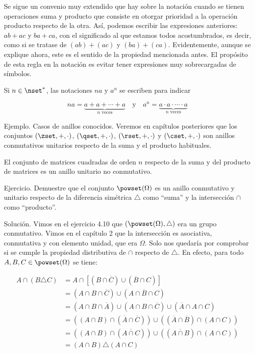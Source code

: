 Se sigue un convenio muy extendido que hay sobre la notación cuando se
tienen operaciones suma y producto que consiste en otorgar prioridad a la
operación producto respecto de la otra. Así, podemos escribir las
expresiones anteriores: $ab + ac$ y $ba + ca$, con el significado al que
estamos todos acostumbrados, es decir, como si se tratase de $(ab) + (ac)$ y
$(ba) + (ca)$. Evidentemente, aunque se explique ahora, este es el sentido
de la propiedad mencionada antes. El propósito de esta regla en la notación
es evitar tener expresiones muy sobrecargadas de símbolos.

Si $n \in \nset^*$, las notaciones $na$ y $a^n$ se escriben para indicar

$$ na = \underbrace{a + a + \cdots + a}_{\text{$n$ veces}} \quad \text{y}
\quad a^n = \underbrace{a \cdot a \cdot \cdots \cdot a}_{\text{$n$ veces}}
$$

Ejemplo. Casos de anillos conocidos. Veremos en capítulos posteriores que
los conjuntos $(\zset, +, \cdot)$, $(\qset, +, \cdot)$, $(\rset, +, \cdot)$
y $(\cset, +, \cdot)$ son anillos conmutativos unitarios respecto de la suma
y el producto habituales.

El conjunto de matrices cuadradas de orden $n$ respecto de la suma y del
producto de matrices es un anillo unitario no conmutativo.

Ejercicio. Demuestre que el conjunto $\powset(\Omega)$ es un anillo
conmutativo y unitario respecto de la diferencia simétrica $\triangle$ como
``suma'' y la intersección $\cap$ como ``producto''.

Solución. Vimos en el ejercicio 4.10 que $(\powset(\Omega), \triangle)$ era
un grupo conmutativo. Vimos en el capítulo 2 que la intersección es
asociativa, conmutativa y con elemento unidad, que era $\Omega$. Solo nos
quedaría por comprobar si se cumple la propiedad distributiva de $\cap$
respecto de $\triangle$. En efecto, para todo $A,B,C \in \powset(\Omega)$ se
tiene:

\begin{align*}
  A \cap (B \triangle C)
    &= A \cap [(B \cap \overline{C}) \cup (\overline{B} \cap C)] \\
    &= (A \cap B \cap \overline{C}) \cup (A \cap \overline{B} \cap C) \\
    &= (A \cap B \cap \overline{A}) \cup (A \cap B \cap \overline{C}) \cup
      (\overline{A} \cap A \cap C) \\
    &= ((A \cap B) \cap (\overline{A} \cap \overline{C})) \cup
      ((\overline{A} \cap \overline{B}) \cap (A \cap C)) \\
    &= ((A \cap B) \cap (\overline{A \cap C})) \cup ((\overline{A \cap B})
      \cap (A \cap C)) \\
    &= (A \cap B) \triangle (A \cap C) \\
\end{align*}

